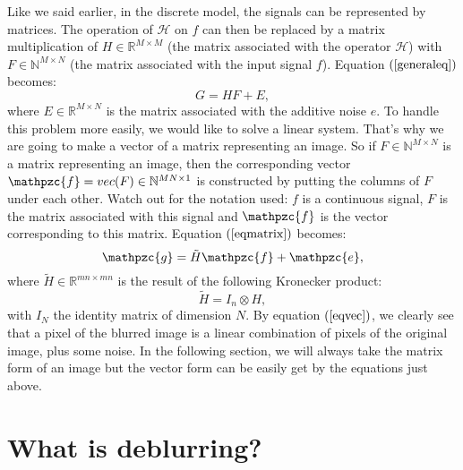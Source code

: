 Like we said earlier, in the discrete model, the signals can be represented by matrices. The operation of $\mathcal{H}$ on $f$ can then be replaced by a matrix multiplication of $H \in \mathbb{R}^{M \times M}$ (the matrix associated with the operator $\mathcal{H}$) with $F \in \mathbb{N}^{M \times N}$ (the matrix associated with the input signal $f$). Equation $(\ref{generaleq})$ becomes:
\begin{equation}
G = HF + E,
\label{eqmatrix}
\end{equation}
where $E \in \mathbb{R}^{M \times N}$ is the matrix associated with the additive noise $e$. To handle this problem more easily, we would like to solve a linear system. That's why we are going to make a vector of a matrix representing an image. So if $F \in \mathbb{N}^{M \times N}$ is a matrix representing an image, then the corresponding vector $\mathpzc{f} = vec(F) \in \mathbb{N}^{MN \times 1}$ is constructed by putting the columns of $F$ under each other. Watch out for the notation used: $f$ is a continuous signal, $F$ is the matrix associated with this signal and $\mathpzc{f}$  is the vector corresponding to this matrix. Equation $(\ref{eqmatrix})$ becomes:
\begin{equation}
\mathpzc{g} = \tilde{H}\mathpzc{f} + \mathpzc{e},
\label{eqvec}
\end{equation}
where $\tilde{H} \in \mathbb{R}^{mn \times mn}$ is the result of the following Kronecker product:
\begin{equation}
\tilde{H} = I_n \otimes H,
\end{equation}
with $I_N$ the identity matrix of dimension $N$. By equation $(\ref{eqvec})$, we clearly see that a pixel of the blurred image is a linear combination of pixels of the original image, plus some noise. In the following section, we will always take the matrix form of an image but the vector form can be easily get by the equations just above.

\section{What is deblurring?}

